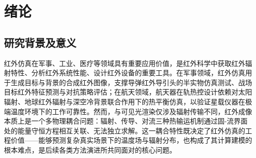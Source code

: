 
%
\chapter{绪论}%

\section{研究背景及意义}
红外仿真在军事、工业、医疗等领域具有重要应用价值，是红外科学中获取红外辐射特性、分析红外系统性能、设计红外设备的重要工具\cite{upadhyayComprehensiveSurveySynthetic2025,LuQiHongWaiChangJingFangZhenFangFaJiFaZhanXianZhuangYanJiuZongShu2024,WangXiaHongWaiChangJingFangZhenJiShuFaZhanZongShu2015}。在军事领域，红外仿真用于生成目标与背景的合成红外图像，支撑导弹红外导引头的半实物仿真测试、战场目标红外特征预测与对抗策略评估\cite{upadhyayComprehensiveSurveySynthetic2025}；在航天领域，航天器在轨热控设计依赖对太阳辐射、地球红外辐射与深空冷背景联合作用下的热平衡仿真，以验证星载仪器在极端温度环境下的工作可靠性\cite{modestRadiativeHeatTransfer2013}。然而，与可见光渲染仅涉及辐射传输不同，红外成像本质上是一个多物理耦合问题：辐射、传导、对流三种热输运机制通过固-流界面处的能量守恒方程相互关联、无法独立求解。这一耦合特性既决定了红外仿真的工程价值——能够预测复杂真实场景下的温度场与辐射分布，也构成了其计算建模的根本难点，是后续各类方法演进所共同面对的核心问题。

